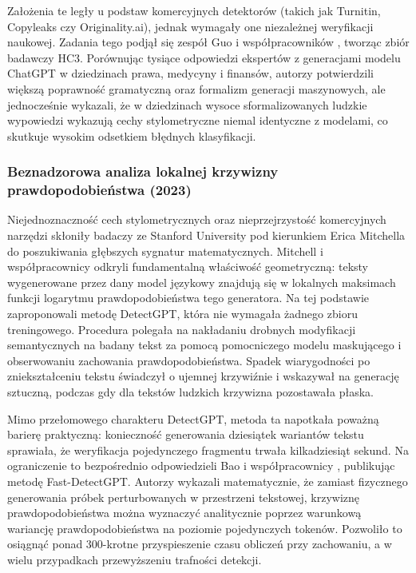 Założenia te legły u podstaw komercyjnych detektorów (takich jak Turnitin, Copyleaks czy Originality.ai), jednak wymagały one niezależnej weryfikacji naukowej. Zadania tego podjął się zespół Guo i współpracowników \cite{guo2023hc3}, tworząc zbiór badawczy HC3. Porównując tysiące odpowiedzi ekspertów z generacjami modelu ChatGPT w dziedzinach prawa, medycyny i finansów, autorzy potwierdzili większą poprawność gramatyczną oraz formalizm generacji maszynowych, ale jednocześnie wykazali, że w dziedzinach wysoce sformalizowanych ludzkie wypowiedzi wykazują cechy stylometryczne niemal identyczne z modelami, co skutkuje wysokim odsetkiem błędnych klasyfikacji.

\subsubsection{Beznadzorowa analiza lokalnej krzywizny prawdopodobieństwa (2023)}

Niejednoznaczność cech stylometrycznych oraz nieprzejrzystość komercyjnych narzędzi skłoniły badaczy ze Stanford University pod kierunkiem Erica Mitchella \cite{mitchell2023detectgpt} do poszukiwania głębszych sygnatur matematycznych. Mitchell i współpracownicy odkryli fundamentalną właściwość geometryczną: teksty wygenerowane przez dany model językowy znajdują się w lokalnych maksimach funkcji logarytmu prawdopodobieństwa tego generatora. Na tej podstawie zaproponowali metodę DetectGPT, która nie wymagała żadnego zbioru treningowego. Procedura polegała na nakładaniu drobnych modyfikacji semantycznych na badany tekst za pomocą pomocniczego modelu maskującego i obserwowaniu zachowania prawdopodobieństwa. Spadek wiarygodności po zniekształceniu tekstu świadczył o ujemnej krzywiźnie i wskazywał na generację sztuczną, podczas gdy dla tekstów ludzkich krzywizna pozostawała płaska.

Mimo przełomowego charakteru DetectGPT, metoda ta napotkała poważną barierę praktyczną: konieczność generowania dziesiątek wariantów tekstu sprawiała, że weryfikacja pojedynczego fragmentu trwała kilkadziesiąt sekund. Na ograniczenie to bezpośrednio odpowiedzieli Bao i współpracownicy \cite{bao2023fastdetectgpt}, publikując metodę Fast-DetectGPT. Autorzy wykazali matematycznie, że zamiast fizycznego generowania próbek perturbowanych w przestrzeni tekstowej, krzywiznę prawdopodobieństwa można wyznaczyć analitycznie poprzez warunkową wariancję prawdopodobieństwa na poziomie pojedynczych tokenów. Pozwoliło to osiągnąć ponad 300-krotne przyspieszenie czasu obliczeń przy zachowaniu, a w wielu przypadkach przewyższeniu trafności detekcji.

